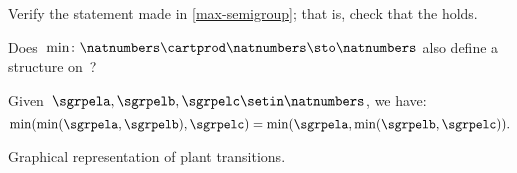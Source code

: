 \begin{exercise}
    \label{ex:max-semigroup}
    Verify the statement made in \cref{max-semigroup}; that is, check that the  holds.

    Does~$\min \colon \natnumbers \cartprod \natnumbers \sto \natnumbers$ also define a  structure on~\natnumbers ?
\end{exercise}
\begin{solution}
    Given~$\sgrpela,\sgrpelb,\sgrpelc\setin \natnumbers$, we have:
    \begin{equation}
        \label{eq:min-assoc}
        \min(\min(\sgrpela,\sgrpelb),\sgrpelc)=\min(\sgrpela,\min(\sgrpelb,\sgrpelc)).
    \end{equation}
\end{solution}

\begin{marginfigure}
    \centering
    \caption{Graphical representation of plant transitions.}
    \label{fig:plants_transitions}
\end{marginfigure}

